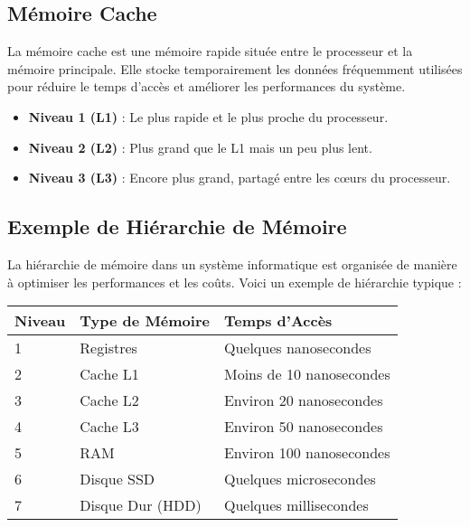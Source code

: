 \documentclass[10pt,a4paper]{article}
\begin{document}
\subsection*{Mémoire Cache}

La mémoire cache est une mémoire rapide située entre le processeur et la mémoire principale. Elle stocke temporairement les données fréquemment utilisées pour réduire le temps d'accès et améliorer les performances du système.

\begin{itemize}
    \item \textbf{Niveau 1 (L1)} : Le plus rapide et le plus proche du processeur.
    \item \textbf{Niveau 2 (L2)} : Plus grand que le L1 mais un peu plus lent.
    \item \textbf{Niveau 3 (L3)} : Encore plus grand, partagé entre les cœurs du processeur.
\end{itemize}


\subsection*{Exemple de Hiérarchie de Mémoire}

La hiérarchie de mémoire dans un système informatique est organisée de manière à optimiser les performances et les coûts. Voici un exemple de hiérarchie typique :

\begin{center}
    \begin{tabular}{|l|l|l|}
    \hline
    \textbf{Niveau} & \textbf{Type de Mémoire} & \textbf{Temps d'Accès} \\
    \hline
    1 & Registres & Quelques nanosecondes \\
    2 & Cache L1 & Moins de 10 nanosecondes \\
    3 & Cache L2 & Environ 20 nanosecondes \\
    4 & Cache L3 & Environ 50 nanosecondes \\
    5 & RAM & Environ 100 nanosecondes \\
    6 & Disque SSD & Quelques microsecondes \\
    7 & Disque Dur (HDD) & Quelques millisecondes \\
    \hline
    \end{tabular}
\end{center}
\end{document}

